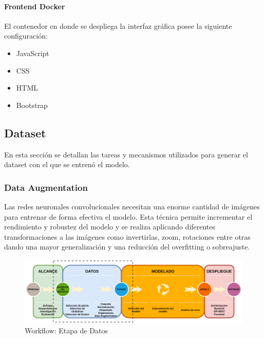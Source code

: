 \paragraph{Frontend Docker}
El contenedor en donde se despliega la interfaz gráfica posee la siguiente configuración:
\begin{itemize}
    \item JavaScript
    \item CSS
    \item HTML
    \item Bootstrap
\end{itemize}

\subsection{Dataset}
En esta sección se detallan las tareas y mecanismos utilizados para generar el dataset con el que se entrenó el modelo.
\subsubsection{Data Augmentation}
Las redes neuronales convolucionales necesitan una enorme cantidad de imágenes para entrenar de forma efectiva el modelo. Esta técnica permite incrementar el rendimiento y robustez del modelo \cite{dataaug} y se realiza aplicando diferentes transformaciones a las imágenes como invertirlas, zoom, rotaciones entre otras dando una mayor generalización y una reducción del overfitting o sobreajuste.

\begin{figure}
    \centering
    \includegraphics[width=1.2\textwidth,center]{img/Wokflow - datos.drawio.png}
    \caption{Workflow: Etapa de Datos}
    \label{fig:workflow - datos}
\end{figure}



